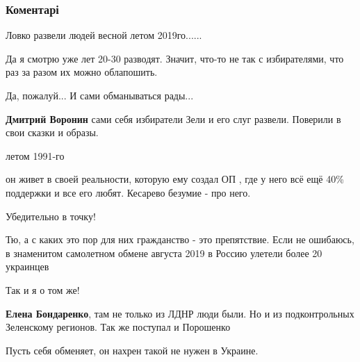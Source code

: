  
 
 
 
 
\subsubsection{Коментарі}

\begin{itemize} %
Ловко развели людей весной летом 2019го......

\begin{itemize} %
Да я смотрю уже лет 20-30 разводят. Значит, что-то не так с избирателями, что раз за разом их можно облапошить.

Да, пожалуй...
И сами обманываться рады...

\textbf{Дмитрий Воронин} сами себя избиратели Зели и его слуг развели. Поверили в свои сказки и образы.

летом 1991-го
\end{itemize} %


он живет в своей реальности, которую ему создал ОП , где у него всё ещё 40\% поддержки и все его любят.
Кесарево безумие - про него.


Убедительно в точку!


Тю, а с каких это пор для них гражданство - это препятствие. Если не ошибаюсь,
в знаменитом самолетном обмене августа 2019 в Россию улетели более 20 украинцев

\begin{itemize} %
Так и я о том же!


\textbf{Елена Бондаренко}, там не только из ЛДНР люди были. Но и из подконтрольных Зеленскому регионов. Так же поступал и Порошенко
\end{itemize} %

Пусть себя обменяет, он нахрен такой не нужен в Украине.


\end{itemize}
